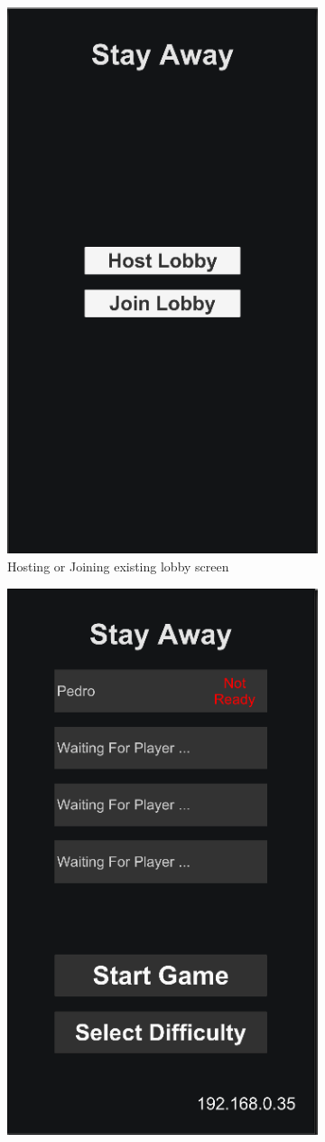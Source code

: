 \documentclass{dissertation}
\begin{document}
\begin{figure}[H]
\begin{subfigure}[h]{.5\textwidth}
\includegraphics[width = .7\linewidth]{images/wireframe2.png}
\caption{Hosting or Joining existing lobby screen}
\label{fig:pp2}
\end{subfigure}
\begin{subfigure}[h]{.5\textwidth}
\centering
\includegraphics[width = .7\linewidth]{images/wireframe3.png}

\end{subfigure}
\end{figure}
\end{document}
